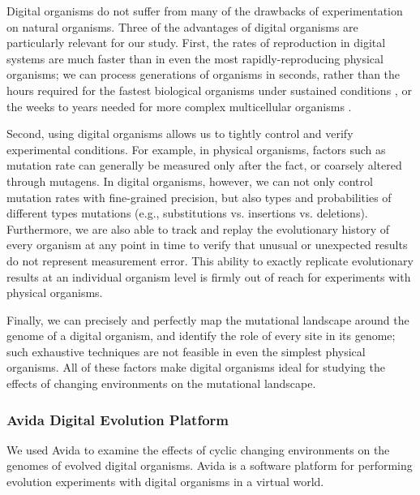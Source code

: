 \documentclass[10pt,letterpaper]{article}
\begin{document}
Digital organisms do not suffer from many of the drawbacks of experimentation on natural organisms.  Three of the advantages of digital organisms are particularly relevant for our study.  First, the rates of reproduction in digital systems are much faster than in even the most rapidly-reproducing physical organisms; we can process generations of organisms in seconds, rather than the hours required for the fastest biological organisms under sustained conditions \cite{ryan_evolution_1953,lenski_long-term_1991}, or the weeks to years needed for more complex multicellular organisms \cite{anderson_outcrossing_2010,stearns_experimental_2000}.

Second, using digital organisms allows us to tightly control and verify experimental conditions. For example, in physical organisms, factors such as mutation rate can generally be measured only after the fact, or coarsely altered through mutagens. In digital organisms, however, we can not only control mutation rates with fine-grained precision, but also types and probabilities of different types mutations (e.g., substitutions vs. insertions vs. deletions). Furthermore, we are also able to track and replay the evolutionary history of every organism at any point in time to verify that unusual or unexpected results do not represent measurement error. This ability to exactly replicate evolutionary results at an individual organism level is firmly out of reach for experiments with physical organisms.

Finally, we can precisely and perfectly map the mutational landscape around the genome of a digital organism, and identify the role of every site in its genome\cite{ofria_evolution_2002}; such exhaustive techniques are not feasible in even the simplest physical organisms.  All of these factors make digital organisms ideal for studying the effects of changing environments on the mutational landscape.

\subsubsection*{Avida Digital Evolution Platform}
We used Avida \cite{lenski_evolutionary_2003} to examine the effects of cyclic changing environments on the genomes of evolved digital organisms. Avida is a software platform for performing evolution experiments with digital organisms in a virtual world.
\end{document}
